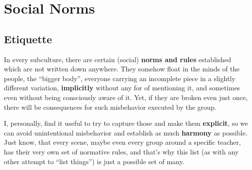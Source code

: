 \section{Social Norms}\label{sec:social-norms}

\subsection{Etiquette}\label{subsec:etiquette}

In every subculture, there are certain (social) \textbf{norms and rules} established which are not written down anywhere.
They somehow float in the minds of the people, the ``bigger body'', everyone carrying an incomplete piece in a slightly different variation, \textbf{implicitly} without any for of mentioning it, and sometimes even without being consciously aware of it.
Yet, if they are broken even just once, there will be consequences for such misbehavior executed by the group.

I, personally, find it useful to try to capture those and make them \textbf{explicit}, so we can avoid unintentional misbehavior and establish as much \textbf{harmony} as possible.
Just know, that every scene, maybe even every group around a specific teacher, has their very own set of normative rules, and that's why this list (as with any other attempt to ``list things'') is just a possible set of many.

